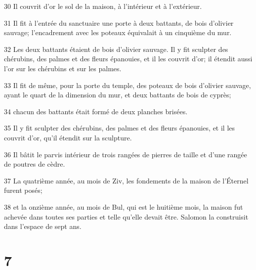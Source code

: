 \par 30 Il couvrit d'or le sol de la maison, à l'intérieur et à l'extérieur.
\par 31 Il fit à l'entrée du sanctuaire une porte à deux battants, de bois d'olivier sauvage; l'encadrement avec les poteaux équivalait à un cinquième du mur.
\par 32 Les deux battants étaient de bois d'olivier sauvage. Il y fit sculpter des chérubins, des palmes et des fleurs épanouies, et il les couvrit d'or; il étendit aussi l'or sur les chérubins et sur les palmes.
\par 33 Il fit de même, pour la porte du temple, des poteaux de bois d'olivier sauvage, ayant le quart de la dimension du mur, et deux battants de bois de cyprès;
\par 34 chacun des battants était formé de deux planches brisées.
\par 35 Il y fit sculpter des chérubins, des palmes et des fleurs épanouies, et il les couvrit d'or, qu'il étendit sur la sculpture.
\par 36 Il bâtit le parvis intérieur de trois rangées de pierres de taille et d'une rangée de poutres de cèdre.
\par 37 La quatrième année, au mois de Ziv, les fondements de la maison de l'Éternel furent posés;
\par 38 et la onzième année, au mois de Bul, qui est le huitième mois, la maison fut achevée dans toutes ses parties et telle qu'elle devait être. Salomon la construisit dans l'espace de sept ans.

\chapter{7}

